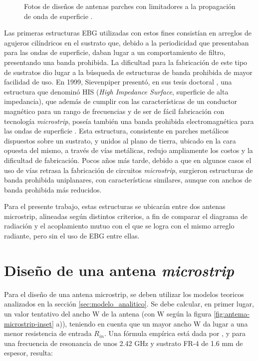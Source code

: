 \begin{figure}[H]
	\centering 
	\hspace{30pt}
	\caption{Fotos de diseños de antenas parches con limitadores a la propagación de onda de superficie \cite{Yang:EBGAntennas}.}
	\label{fig:limitadores-ondas-superficie-yang}
\end{figure}

Las primeras estructuras EBG utilizadas con estos fines consistían en arreglos de agujeros cilíndricos en el sustrato que, debido a la periodicidad que presentaban para las ondas de superficie, daban lugar a un comportamiento de filtro, presentando una banda prohibida. La dificultad para la fabricación de este tipo de sustratos dio lugar a la búsqueda de estructuras de banda prohibida de mayor facilidad de uso. En 1999, Sievenpiper presentó, en sus tesis doctoral \cite{Sievenpiper:Thesis}, una estructura que denominó HIS (\textit{High Impedance Surface}, superficie de alta impedancia), que además de cumplir con las características de un conductor magnético para un rango de frecuencias \cite{Sievenpiper:HIESForbiddenBand} y de ser de fácil fabricación con tecnología \textit{microstrip}, poseía también una banda prohibida electromagnética para las ondas de superficie \cite{Marcela:Tesis}. Esta estructura, consistente en parches metálicos dispuestos sobre un sustrato, y unidos al plano de tierra, ubicado en la cara opuesta del mismo, a través de vías metálicas, redujo ampliamente los costos y la dificultad de fabricación. Pocos años más tarde, debido a que en algunos casos el uso de vías retrasa la fabricación de circuitos \textit{microstrip}, surgieron estructuras de banda prohibida uniplanares, con características similares, aunque con anchos de banda prohibida más reducidos.

Para el presente trabajo, estas estructuras se ubicarán entre dos antenas microstrip, alineadas según distintos criterios, a fin de comparar el diagrama de radiación y el acoplamiento mutuo con el que se logra con el mismo arreglo radiante, pero sin el uso de EBG entre ellas.

\section{Diseño de una antena \textit{microstrip}}
\label{sec_disenio_microstrip}
Para el diseño de una antena microstrip, se deben utilizar los modelos teoricos analizados en la sección \ref{sec:modelo_analitico}. Se debe calcular, en primer lugar, un valor tentativo del ancho W de la antena (con W según la figura \ref{fig:antema-microstrip-inset} a)), teniendo en cuenta que un mayor ancho W da lugar a una menor resistencia de entrada $R_{in}$. Una fórmula empírica está dada por \cite{Barthia:Handbook}, y para una frecuencia de resonancia de unos 2.42 GHz y sustrato FR-4 de 1.6 mm de espesor, resulta:

